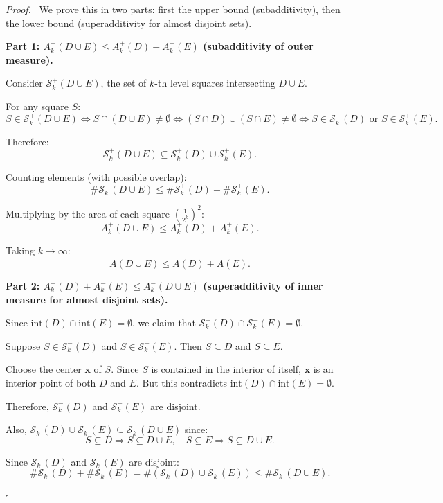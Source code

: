 \documentclass[11pt]{report}
\renewenvironment{proof}[1][Proof]{\par\noindent\textit{#1.}\ }{\hfill$\square$\par\medskip}
\begin{document}
\begin{proof}
We prove this in two parts: first the upper bound (subadditivity), then the lower bound (superadditivity for almost disjoint sets).

\textbf{Part 1: $A_k^+(D \cup E) \leq A_k^+(D) + A_k^+(E)$ (subadditivity of outer measure).}

Consider $\mathcal{S}_k^+(D \cup E)$, the set of $k$-th level squares intersecting $D \cup E$.

For any square $S$:
\[
S \in \mathcal{S}_k^+(D \cup E) \iff S \cap (D \cup E) \neq \emptyset \iff (S \cap D) \cup (S \cap E) \neq \emptyset \iff S \in \mathcal{S}_k^+(D) \text{ or } S \in \mathcal{S}_k^+(E).
\]

Therefore:
\[
\mathcal{S}_k^+(D \cup E) \subseteq \mathcal{S}_k^+(D) \cup \mathcal{S}_k^+(E).
\]

Counting elements (with possible overlap):
\[
\#\mathcal{S}_k^+(D \cup E) \leq \#\mathcal{S}_k^+(D) + \#\mathcal{S}_k^+(E).
\]

Multiplying by the area of each square $\left(\frac{1}{2^k}\right)^2$:
\[
A_k^+(D \cup E) \leq A_k^+(D) + A_k^+(E).
\]

Taking $k \to \infty$:
\[
\overline{A}(D \cup E) \leq \overline{A}(D) + \overline{A}(E).
\]

\textbf{Part 2: $A_k^-(D) + A_k^-(E) \leq A_k^-(D \cup E)$ (superadditivity of inner measure for almost disjoint sets).}

Since $\text{int}(D) \cap \text{int}(E) = \emptyset$, we claim that $\mathcal{S}_k^-(D) \cap \mathcal{S}_k^-(E) = \emptyset$.

Suppose $S \in \mathcal{S}_k^-(D)$ and $S \in \mathcal{S}_k^-(E)$. Then $S \subseteq D$ and $S \subseteq E$.

Choose the center $\mathbf{x}$ of $S$. Since $S$ is contained in the interior of itself, $\mathbf{x}$ is an interior point of both $D$ and $E$. But this contradicts $\text{int}(D) \cap \text{int}(E) = \emptyset$.

Therefore, $\mathcal{S}_k^-(D)$ and $\mathcal{S}_k^-(E)$ are disjoint.

Also, $\mathcal{S}_k^-(D) \cup \mathcal{S}_k^-(E) \subseteq \mathcal{S}_k^-(D \cup E)$ since:
\[
S \subseteq D \Rightarrow S \subseteq D \cup E, \quad S \subseteq E \Rightarrow S \subseteq D \cup E.
\]

Since $\mathcal{S}_k^-(D)$ and $\mathcal{S}_k^-(E)$ are disjoint:
\[
\#\mathcal{S}_k^-(D) + \#\mathcal{S}_k^-(E) = \#(\mathcal{S}_k^-(D) \cup \mathcal{S}_k^-(E)) \leq \#\mathcal{S}_k^-(D \cup E).
\]


\end{proof}
\end{document}
